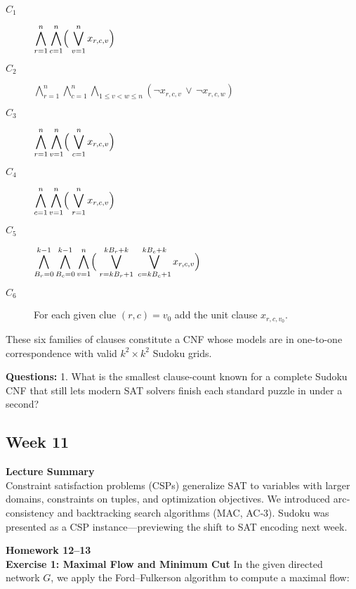 \documentclass{article}
\theoremstyle{theorem}
\theoremstyle{definition}
\theoremstyle{remark}
\begin{document}
\begin{description}
  \item[$C_1$] $\displaystyle
     \bigwedge_{r=1}^{n}\bigwedge_{c=1}^{n}
       \Bigl(\;\bigvee_{v=1}^{n} x_{r,c,v}\Bigr)$

  \item[$C_2$] $\displaystyle
     \bigwedge_{r=1}^{n}\bigwedge_{c=1}^{n}
       \bigwedge_{1\le v<w\le n}
       (\neg x_{r,c,v}\,\lor\,\neg x_{r,c,w})$

  \item[$C_3$] $\displaystyle
     \bigwedge_{r=1}^{n}\bigwedge_{v=1}^{n}
       \Bigl(\;\bigvee_{c=1}^{n} x_{r,c,v}\Bigr)$

  \item[$C_4$] $\displaystyle
     \bigwedge_{c=1}^{n}\bigwedge_{v=1}^{n}
       \Bigl(\;\bigvee_{r=1}^{n} x_{r,c,v}\Bigr)$

  \item[$C_5$] $\displaystyle
     \bigwedge_{B_r=0}^{k-1}\bigwedge_{B_c=0}^{k-1}\bigwedge_{v=1}^{n}
       \Bigl(\;
         \bigvee_{r=kB_r+1}^{kB_r+k}
         \;\bigvee_{c=kB_c+1}^{kB_c+k}
         x_{r,c,v}\Bigr)$

  \item[$C_6$]  For each given clue $(r,c)=v_{0}$ add the unit clause $x_{r,c,v_{0}}$.
\end{description}

These six families of clauses constitute a CNF whose models are in one-to-one correspondence with valid \(k^{2}\times k^{2}\) Sudoku grids.

\bigskip
\textbf{Questions:} 1. What is the smallest clause-count known for a complete Sudoku CNF that still lets modern SAT solvers finish each standard puzzle in under a second?



\subsection{Week 11}
\textbf{Lecture Summary}\\
Constraint satisfaction problems (CSPs) generalize SAT to variables with larger domains, constraints on tuples, and optimization objectives.  We introduced arc‐consistency and backtracking search algorithms (MAC, AC‐3).  Sudoku was presented as a CSP instance—previewing the shift to SAT encoding next week.


\noindent\textbf{Homework 12--13}\\
\vspace{1em}
\noindent\textbf{Exercise 1: Maximal Flow and Minimum Cut}
In the given directed network $G$, we apply the Ford--Fulkerson algorithm to compute a maximal flow:
\end{document}
